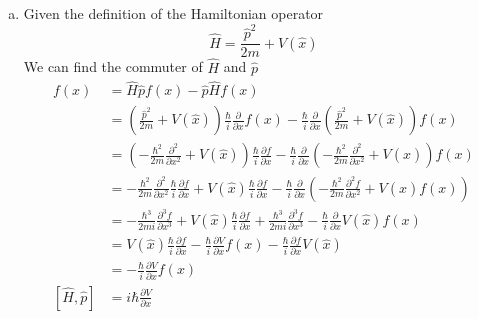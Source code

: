 \documentclass[11pt]{article}
\numberwithin{equation}{section}
\begin{document}
\begin{enumerate}[(a)]
\item
Given the definition of the Hamiltonian operator 
$$\hat{H} = \frac{\hat{p}^2}{2m}+V(\hat{x})$$
We can find the commuter of $\hat{H}$ and $\hat{p}$
\begin{align*}
[\hat{H},\hat{p}]f(x) &= \hat{H}\hat{p}f(x) - \hat{p}\hat{H}f(x)\\
&= \left(\frac{\hat{p}^2}{2m}+V(\hat{x})\right)\frac{\hbar}{i}\frac{\partial}{\partial x}f(x) - \frac{\hbar}{i}\frac{\partial}{\partial x}\left(\frac{\hat{p}^2}{2m}+V(\hat{x})\right)f(x)\\
&= \left(-\frac{\hbar^2}{2m}\frac{\partial^2}{\partial x^2}+V(\hat{x})\right)\frac{\hbar}{i}\frac{\partial f}{\partial x} - \frac{\hbar}{i}\frac{\partial}{\partial x}\left(-\frac{\hbar^2}{2m}\frac{\partial^2}{\partial x^2}+V(\hat{x})\right)f(x)\\
&= -\frac{\hbar^2}{2m}\frac{\partial^2}{\partial x^2}\frac{\hbar}{i}\frac{\partial f}{\partial x}+V(\hat{x})\frac{\hbar}{i}\frac{\partial f}{\partial x} - \frac{\hbar}{i}\frac{\partial}{\partial x}\left(-\frac{\hbar^2}{2m}\frac{\partial^2f}{\partial x^2}+V(\hat{x})f(x)\right)\\
&= -\frac{\hbar^3}{2mi}\frac{\partial^3f}{\partial x^3}+V(\hat{x})\frac{\hbar}{i}\frac{\partial f}{\partial x} + \frac{\hbar^3}{2mi}\frac{\partial^3f}{\partial x^3} - \frac{\hbar}{i}\frac{\partial}{\partial x}V(\hat{x})f(x)\\
&= V(\hat{x})\frac{\hbar}{i}\frac{\partial f}{\partial x}  -\frac{\hbar}{i}\frac{\partial V}{\partial x}f(x)-\frac{\hbar}{i}\frac{\partial f}{\partial x}V(\hat{x})\\
&=  -\frac{\hbar}{i}\frac{\partial V}{\partial x}f(x)\\
[\hat{H},\hat{p}] &=  i\hbar\frac{\partial V}{\partial x}
\end{align*}


\end{enumerate}
\end{document}
